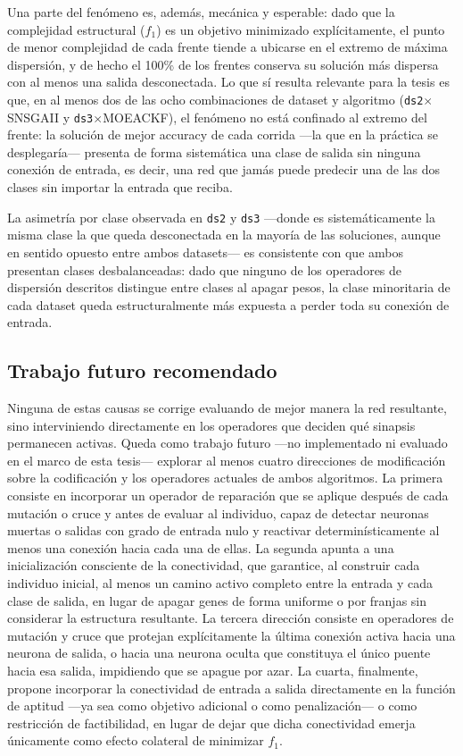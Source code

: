 Una parte del fenómeno es, además, mecánica y esperable: dado que la complejidad estructural ($f_1$) es un objetivo minimizado explícitamente, el punto de menor complejidad de cada frente tiende a ubicarse en el extremo de máxima dispersión, y de hecho el 100\% de los frentes conserva su solución más dispersa con al menos una salida desconectada. Lo que sí resulta relevante para la tesis es que, en al menos dos de las ocho combinaciones de dataset y algoritmo (\texttt{ds2}$\times$SNSGAII y \texttt{ds3}$\times$MOEACKF), el fenómeno no está confinado al extremo del frente: la solución de mejor accuracy de cada corrida —la que en la práctica se desplegaría— presenta de forma sistemática una clase de salida sin ninguna conexión de entrada, es decir, una red que jamás puede predecir una de las dos clases sin importar la entrada que reciba.

La asimetría por clase observada en \texttt{ds2} y \texttt{ds3} —donde es sistemáticamente la misma clase la que queda desconectada en la mayoría de las soluciones, aunque en sentido opuesto entre ambos datasets— es consistente con que ambos presentan clases desbalanceadas: dado que ninguno de los operadores de dispersión descritos distingue entre clases al apagar pesos, la clase minoritaria de cada dataset queda estructuralmente más expuesta a perder toda su conexión de entrada.

\subsection{Trabajo futuro recomendado}

Ninguna de estas causas se corrige evaluando de mejor manera la red resultante, sino interviniendo directamente en los operadores que deciden qué sinapsis permanecen activas. Queda como trabajo futuro —no implementado ni evaluado en el marco de esta tesis— explorar al menos cuatro direcciones de modificación sobre la codificación y los operadores actuales de ambos algoritmos. La primera consiste en incorporar un operador de reparación que se aplique después de cada mutación o cruce y antes de evaluar al individuo, capaz de detectar neuronas muertas o salidas con grado de entrada nulo y reactivar determinísticamente al menos una conexión hacia cada una de ellas. La segunda apunta a una inicialización consciente de la conectividad, que garantice, al construir cada individuo inicial, al menos un camino activo completo entre la entrada y cada clase de salida, en lugar de apagar genes de forma uniforme o por franjas sin considerar la estructura resultante. La tercera dirección consiste en operadores de mutación y cruce que protejan explícitamente la última conexión activa hacia una neurona de salida, o hacia una neurona oculta que constituya el único puente hacia esa salida, impidiendo que se apague por azar. La cuarta, finalmente, propone incorporar la conectividad de entrada a salida directamente en la función de aptitud —ya sea como objetivo adicional o como penalización— o como restricción de factibilidad, en lugar de dejar que dicha conectividad emerja únicamente como efecto colateral de minimizar $f_1$.
